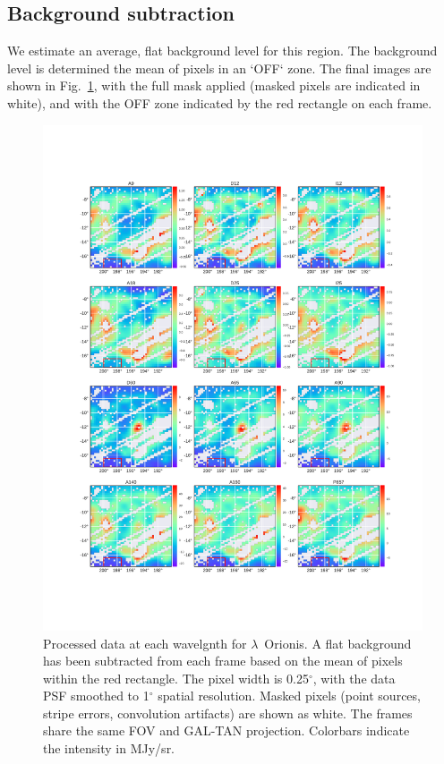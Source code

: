       \subsection{Background subtraction}
         We estimate an average, flat background level for this region. The background level is determined the mean of pixels in an `OFF` zone. The final images are shown in Fig.~\ref{fig:lori_processed_all}, with the full mask applied (masked pixels are indicated in white), and with the OFF zone indicated by the red rectangle on each frame.
            \begin{figure}
              \includegraphics[width=\textwidth,trim={5cm 5cm 3.5cm 5cm},clip]{../Plots/ch_lori/lori_processed_grid.pdf}
              \centering
              \caption{Processed data at each wavelgnth for $\lambda$~Orionis. A flat background has been subtracted from each frame based on the mean of pixels within the red rectangle. The pixel width is 0.25$^{\circ}$, with the data PSF smoothed to 1$^{\circ}$ spatial resolution. Masked pixels (point sources, stripe errors, convolution artifacts) are shown as white. The frames share the same FOV and GAL-TAN projection. Colorbars indicate the intensity in MJy/sr.}
              \label{fig:lori_processed_all}
            \end{figure}
